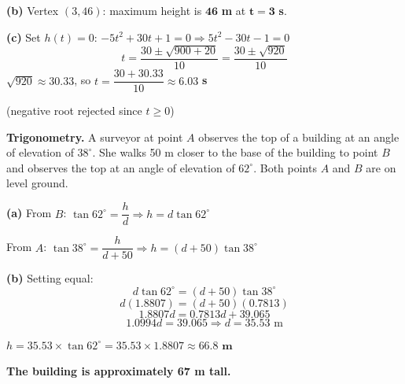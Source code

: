 \documentclass[addpoints]{exam}
\begin{document}
\begin{questions}
\begin{solution}[10cm]
\textbf{(b)} Vertex $(3, 46)$: maximum height is $\mathbf{46}$ \textbf{m} at $\mathbf{t = 3}$ \textbf{s}.

\textbf{(c)} Set $h(t) = 0$: $-5t^2 + 30t + 1 = 0 \Rightarrow 5t^2 - 30t - 1 = 0$
\[t = \frac{30 \pm \sqrt{900 + 20}}{10} = \frac{30 \pm \sqrt{920}}{10}\]
$\sqrt{920} \approx 30.33$, so $t = \dfrac{30 + 30.33}{10} \approx \mathbf{6.03}$ \textbf{s}

(negative root rejected since $t \geq 0$)
\end{solution}

\question[8] \textbf{Trigonometry.} A surveyor at point $A$ observes the top of a building at an angle of
elevation of $38^\circ$. She walks 50 m closer to the base of the building to point $B$ and observes the
top at an angle of elevation of $62^\circ$. Both points $A$ and $B$ are on level ground.
\begin{solution}[10cm]
\textbf{(a)} From $B$: $\tan 62^\circ = \dfrac{h}{d} \Rightarrow h = d\tan 62^\circ$

From $A$: $\tan 38^\circ = \dfrac{h}{d + 50} \Rightarrow h = (d+50)\tan 38^\circ$

\textbf{(b)} Setting equal:
\[d\tan 62^\circ = (d+50)\tan 38^\circ\]
\[d(1.8807) = (d+50)(0.7813)\]
\[1.8807d = 0.7813d + 39.065\]
\[1.0994d = 39.065 \Rightarrow d = 35.53 \text{ m}\]

$h = 35.53 \times \tan 62^\circ = 35.53 \times 1.8807 \approx \mathbf{66.8 \text{ m}}$

\textbf{The building is approximately 67 m tall.}
\end{solution}

\end{questions}
\end{document}

